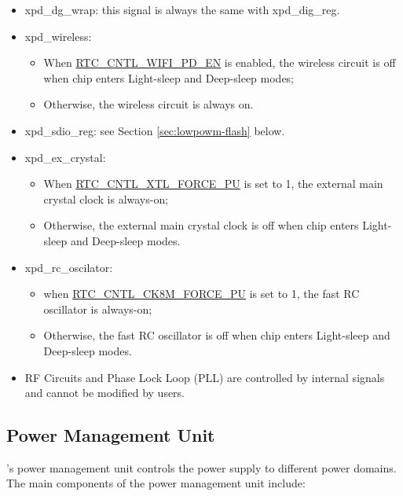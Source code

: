 \documentclass[main\_\_EN.tex]{subfiles}
\begin{document}
\begin{tiplisting}
\begin{itemize}
\begin{itemize}
        \item xpd\_dg\_wrap: this signal is always the same with xpd\_dig\_reg.

        \item xpd\_wireless:
        \begin{itemize}
            \item When \hyperref[fielddesc:RTCCNTLDGWRAPPDEN]{RTC\_CNTL\_WIFI\_PD\_EN} is enabled, the wireless circuit is off when chip enters Light-sleep and Deep-sleep modes;
            \item Otherwise, the wireless circuit is always on.
        \end{itemize}

        \item xpd\_sdio\_reg: see Section \ref{sec:lowpowm-flash} below.
        \item  xpd\_ex\_crystal:
        \begin{itemize}
            \item When \hyperref[fielddesc:RTCCNTLXTLFORCEPU]{RTC\_CNTL\_XTL\_FORCE\_PU} is set to 1, the external main crystal clock is always-on;
            \item Otherwise, the external main crystal clock is off when chip enters Light-sleep and Deep-sleep modes.
        \end{itemize}
        \item xpd\_rc\_oscilator:
        \begin{itemize}
            \item when \hyperref[fielddesc:RTCCNTLCK8MFORCEPU]{RTC\_CNTL\_CK8M\_FORCE\_PU} is set to 1, the fast RC oscillator is always-on;
            \item Otherwise, the fast RC oscillator is off when chip enters Light-sleep and Deep-sleep modes.
        \end{itemize}
        \item RF Circuits and Phase Lock Loop (PLL) are controlled by internal signals and cannot be modified by users.
\end{itemize}
\end{itemize}
\end{tiplisting}

\subsection{Power Management Unit}

\chipname{}'s power management unit controls the power supply to different power domains. The main components of the power management unit include:
\end{document}
